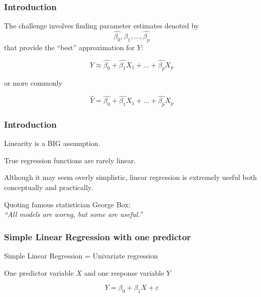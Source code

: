 \documentclass[12pt]{beamer}\usepackage[]{graphicx}\usepackage[]{color}
\begin{document}

\begin{frame}
\frametitle{Introduction}

The challenge involves finding parameter estimates denoted by 
$$
\hat{\beta_0}, \hat{\beta_1}, \dots, \hat{\beta_p}
$$
that provide the ``best'' approximation for $Y$:

$$
Y \approx \hat{\beta_0} + \hat{\beta_1} X_1 + \dots + \hat{\beta_p} X_p
$$

or more commonly

$$
\hat{Y} = \hat{\beta_0} + \hat{\beta_1} X_1 + \dots + \hat{\beta_p} X_p
$$

\end{frame}


\begin{frame}
\frametitle{Introduction}

\bbi
  \item Linearity is a BIG assumption.
  \item True regression functions are rarely linear.
  \item Although it may seem overly simplistic, linear regression is 
  extremely useful both conceptually and practically.
  \item Quoting famous statistician George Box: \\
  \textit{``All models are worng, but some are useful.''}
\ei

\end{frame}


\begin{frame}
\begin{center}
\Huge{}
\end{center}
\end{frame}


\begin{frame}
\frametitle{Simple Linear Regression with one predictor}

\bbi
  \item Simple Linear Regression = Univariate regression
  \item One predictor variable $X$ and one response variable $Y$
\ei

{\large
$$
Y = \beta_0 + \beta_1 X + \varepsilon
$$
}

\end{frame}
\end{document}
